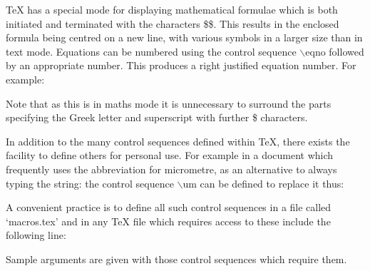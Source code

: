 {\TeX} has a special mode for displaying mathematical formulae which
is both initiated and terminated with the characters \$\$.
This results in the enclosed formula being centred on a new line, with
various symbols in a larger size than in text mode.
Equations can be numbered using the control sequence $\backslash$eqno
followed by an appropriate number.
This produces a right justified equation number. 
For example:
\medskip
{}

Note that as this is in maths mode it is unnecessary to surround the
parts specifying the Greek letter and superscript with further \$ characters.



In addition to the many control sequences defined within \TeX, there exists
the facility to define others for personal use.
For example in a document which frequently uses the abbreviation for
micrometre, as an alternative to always typing the string:
\medskip
{}
the control sequence $\backslash$um can be defined to replace it thus:
\medskip
{}

\rm
A convenient practice is to define all such control sequences in a file
called `macros.tex' and in any {\TeX} file which requires access to these
include the following line:
\medskip
{}

\vfill\eject


\nobreak

Sample arguments are given with those control sequences which
require them.

\nobreak


    


